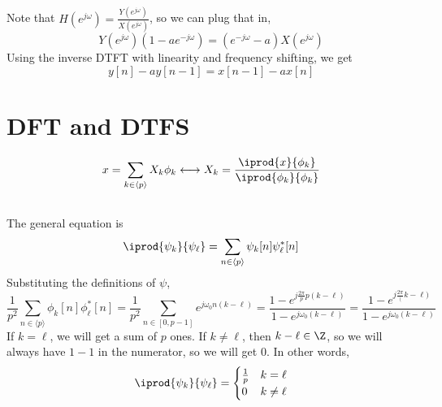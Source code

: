 \documentclass{article}
\begin{document}
\subsection{}

Note that \(H(e^{j \omega}) = \frac{Y(e^{j \omega})}{X(e^{j \omega})}\), so we can plug that in,
\begin{equation}
    Y(e^{j \omega}) (1 - ae^{-j \omega}) = (e^{-j \omega} - a) X(e^{j \omega})
\end{equation}
Using the inverse DTFT with linearity and frequency shifting, we get
\begin{equation}
    y[n] - ay[n - 1] = x[n - 1] - ax[n]
\end{equation}

\section{DFT and DTFS}

\begin{equation}
    x = \sum_{k \in \langle p \rangle} X_k \phi_k \longleftrightarrow X_k = \frac{\iprod{x}{\phi_k}}{\iprod{\phi_k}{\phi_k}}
\end{equation}

\subsection{}

The general equation is
\begin{equation}
    \iprod{\psi_k}{\psi_\ell} = \sum_{n \in \langle p \rangle} \psi_k[n] \psi_\ell^\ast[n]
\end{equation}
Substituting the definitions of \(\psi\),
\begin{equation}
    \frac{1}{p^2} \sum_{n \in \langle p \rangle} \phi_k[n] \phi_\ell^\ast[n] = \frac{1}{p^2} \sum_{n \in [0, p - 1]} e^{j \omega_0 n (k - \ell)} = \frac{1 - e^{j \frac{2\pi}{p} p (k - \ell)}}{1 - e^{j \omega_0 (k - \ell)}} = \frac{1 - e^{j \frac{2\pi} (k - \ell)}}{1 - e^{j \omega_0 (k - \ell)}}
\end{equation}
If \(k = \ell\), we will get a sum of \(p\) ones.
If \(k \neq \ell\), then \(k - \ell \in \Z\), so we will always have \(1 - 1\) in the numerator, so we will get \(0\).
In other words,
\begin{equation}
    \iprod{\psi_k}{\psi_\ell} =
    \begin{cases}
        \frac{1}{p} & k = \ell \\
        0 & k \neq \ell
    \end{cases}
\end{equation}
\end{document}
